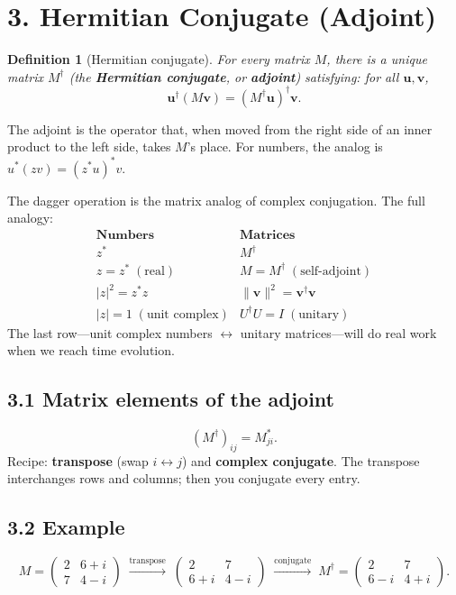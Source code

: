 \documentclass[12pt,a4paper]{article}
\newtheorem{definition}{Definition}
\begin{document}
\section{3. Hermitian Conjugate (Adjoint)}

\begin{definition}[Hermitian conjugate]
For every matrix $M$, there is a unique matrix $M^\dagger$ (the \textbf{Hermitian conjugate}, or \textbf{adjoint}) satisfying: for all $\mathbf{u},\mathbf{v}$,
\[
    \mathbf{u}^\dagger(M\mathbf{v}) = (M^\dagger\mathbf{u})^\dagger\mathbf{v}.
\]
\end{definition}

\noindent The adjoint is the operator that, when moved from the right side of an inner product to the left side, takes $M$'s place.  For numbers, the analog is $u^*(zv) = (z^* u)^* v$.

\medskip
\noindent The dagger operation is the matrix analog of complex conjugation.  The full analogy:
\[
\renewcommand{\arraystretch}{1.3}
\begin{array}{c|c}
\textbf{Numbers} & \textbf{Matrices} \\\hline
z^* & M^\dagger \\
z = z^* \;(\text{real}) & M = M^\dagger \;(\text{self-adjoint}) \\
|z|^2 = z^* z & \|\mathbf{v}\|^2 = \mathbf{v}^\dagger\mathbf{v} \\
|z| = 1 \;(\text{unit complex}) & U^\dagger U = I \;(\text{unitary})
\end{array}
\]
The last row---unit complex numbers $\leftrightarrow$ unitary matrices---will do real work when we reach time evolution.

\subsection{3.1 Matrix elements of the adjoint}
\[
    \boxed{(M^\dagger)_{ij} = M_{ji}^*.}
\]
Recipe: \textbf{transpose} (swap $i\leftrightarrow j$) and \textbf{complex conjugate}.  The transpose interchanges rows and columns; then you conjugate every entry.

\subsection{3.2 Example}
\[
    M = \begin{pmatrix}2 & 6+i\\7 & 4-i\end{pmatrix}
    \;\xrightarrow{\text{transpose}}\;
    \begin{pmatrix}2 & 7\\6+i & 4-i\end{pmatrix}
    \;\xrightarrow{\text{conjugate}}\;
    M^\dagger = \begin{pmatrix}2 & 7\\6-i & 4+i\end{pmatrix}.
\]
\end{document}
